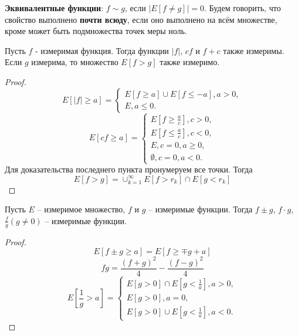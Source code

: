 \documentclass[11pt]{article}
\newcounter{th}\setcounter{th}{0}
\def\th{\par\smallskip\refstepcounter{th}\textbf{\arabic{th}}}
\newtheorem*{Theorem}{Теорема \th}
\begin{document}
\textbf{Эквивалентные функции}:
$f \sim g$, если $|E[f \neq g]| = 0$.
Будем говорить, что свойство выполнено \textbf{почти всюду}, если оно выполнено на всём множестве,
кроме может быть подмножества точек меры ноль.
\begin{Theorem}
Пусть $f$ - измеримая функция. Тогда функции $|f|$, $cf$ и $f + c$ также измеримы. Если $g$
измерима, то множество $E[f > g]$ также измеримо.
\end{Theorem}
\begin{proof}
\begin{equation}
E[|f| \geq a] = \begin{cases}
E[f \geq a] \cup E[f \leq -a], a > 0, \\
E, a \leq 0.
\end{cases}
\end{equation}
\begin{equation}
E[cf \geq a] = \begin{cases}
E[f \geq \frac{a}{c}], c > 0, \\
E[f \leq \frac{a}{c}], c < 0, \\
E, c = 0, a \geq 0, \\
\emptyset, c = 0, a < 0.
\end{cases}
\end{equation}
Для доказательства последнего пункта пронумеруем все точки. Тогда
\begin{equation}
E[f > g] = \cup_{k = 1}^{\infty}E[f > r_k] \cap E[g < r_k]
\end{equation}
\end{proof}
\begin{Theorem}
Пусть $E$ -- измеримое множество, $f$ и $g$ -- измеримые функции. Тогда $f \pm g$, $f\cdot g$,
$\frac{f}g(g \neq 0)$ -- измеримые функции.
\end{Theorem}
\begin{proof}
\begin{equation}
E[f \pm g \geq a] = E[f \geq \mp g + a]
\end{equation}
\begin{equation}
fg = \frac{(f + g)^2}4 - \frac{(f - g)^2}4
\end{equation}
\begin{equation}
E[\frac1g > a] = \begin{cases}
E[g > 0] \cap E[g < \frac1a], a > 0, \\
E[g > 0], a = 0, \\
E[g > 0] \cup E[g < \frac1a], a < 0.
\end{cases}
\end{equation}
\end{proof}
\end{document}
